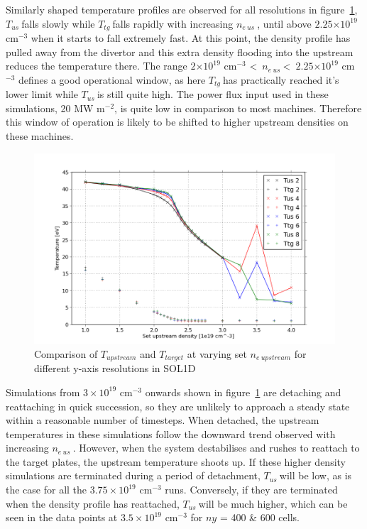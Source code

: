 \documentclass[12pt]{article}  %
\providecommand{\e}[1]{\ensuremath{\times 10^{#1}}} %
\providecommand{\noNe}[1]{{${#1}\times 10^{19}$ cm$^{-3}$}} %
\providecommand{\pow}[1]{{$^{#1}$}} %
\providecommand{\neus}{$n_{e~us}~$} %
\providecommand{\Tus}{$T_{us}~$} %
\providecommand{\Ttg}{$T_{tg}~$} %
\begin{document}
Similarly shaped temperature profiles are observed for all resolutions in figure~\ref{figTT_COMBOstretch4}, \Tus falls slowly while \Ttg falls rapidly with increasing \neus, until above $2.25\e{19}$ cm$^{-3}$ when it starts to fall extremely fast. At this point, the density profile has pulled away from the divertor and this extra density flooding into the upstream reduces the temperature there. The range $2\e{19}$ cm$^{-3}$ \textless~\neus \textless~$2.25\e{19}$ cm$^{-3}$ defines a good operational window, as here \Ttg has practically reached it's lower limit while \Tus is still quite high. The power flux input used in these simulations, 20 MW m\pow{-2}, is quite low in comparison to most machines. Therefore this window of operation is likely to be shifted to higher upstream densities on these machines.

\begin{figure}
\includegraphics[scale=0.5]{Figures/sol1d/TT_COMBOstretch4.png}
\centering
\caption{Comparison of $T_{upstream}$ and $T_{target}$ at varying set $n_{e~upstream}$ for different y-axis resolutions in SOL1D}\label{figTT_COMBOstretch4}
\end{figure}

Simulations from \noNe{3} onwards shown in figure~\ref{figTT_COMBOstretch4} are detaching and reattaching in quick succession, so they are unlikely to approach a steady state within a reasonable number of timesteps. When detached, the upstream temperatures in these simulations follow the downward trend observed with increasing \neus. However, when the system destabilises and rushes to reattach to the target plates, the upstream temperature shoots up. If these higher density simulations are terminated during a period of detachment, \Tus will be low, as is the case for all the \noNe{3.75} runs. Conversely, if they are terminated when the density profile has reattached, \Tus will be much higher, which can be seen in the data points at \noNe{3.5} for $ny$ = 400 \& 600 cells. 
\end{document}

